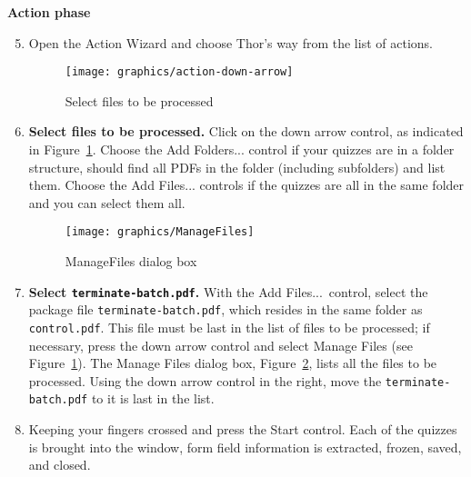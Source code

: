 \documentclass{article}
\def\FmtMP#1{\marginpar{\small\itshape\raggedleft#1}}
\begin{document}
\newtopic\noindent\textbf{Action phase}\vspace{-6pt}\relax
\begin{enumerate}\setcounter{enumi}{4}
  \item Open the \textsf{Action Wizard} and choose \FmtMP{{Action: }\textsf{Thor's
    way}}\textsf{Thor's way} from
      the list of actions.

\begin{figure}[tbh]\centering\setlength\fboxsep{0pt}
\texttt{[image: graphics/action-down-arrow]}\\
\caption{\textsf{Select files to be processed}}\label{cap:ada}
\end{figure}

  \item \textbf{Select files to be processed.} Click on the down arrow
      control, as indicated in Figure~\ref{cap:ada}. Choose the \textsf{Add
      Folders...} control if your quizzes are in a folder structure,
       should find all PDFs in the folder (including
      subfolders) and list them. Choose the \textsf{Add Files...} controls
      if the quizzes are all in the same folder and you can select them
      all.

\begin{figure}[tbh]\centering\setlength\fboxsep{0pt}
\texttt{[image: graphics/ManageFiles]}\\
\caption{\textsf{ManageFiles dialog box}}\label{cap:fmd}
\end{figure}

  \item \textbf{Select \texttt{terminate-batch.pdf}.} With the \textsf{Add
      Files...}\  control, select the package file \texttt{terminate-batch.pdf}, which resides
      in the same folder as \texttt{control.pdf}. This file must be last in
      the list of files to be processed; if necessary, press the down arrow
      control and select \textsf{Manage Files} (see Figure~\ref{cap:ada}).
      The \textsf{Manage Files} dialog box, Figure~\ref{cap:fmd}, lists all
      the files to be processed. Using the down arrow control in the right,
      move the \texttt{terminate-batch.pdf} to it is last in the list.

\item Keeping your fingers crossed and press the \textsf{Start} control. Each
    of the quizzes is brought into the  window, form field
    information is extracted, frozen, saved, and closed.


\end{enumerate}
\end{document}

